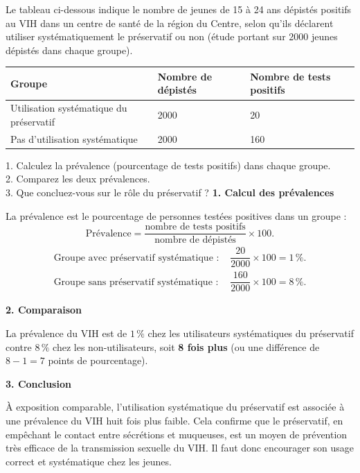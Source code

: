 \documentclass[11pt]{article}
\begin{document}
\begin{exoresolu}
Le tableau ci-dessous indique le nombre de jeunes de 15 à 24 ans dépistés positifs au VIH dans un centre de santé de la région du Centre, selon qu'ils déclarent utiliser systématiquement le préservatif ou non (étude portant sur \num{2000} jeunes dépistés dans chaque groupe).
\begin{center}
\begin{tabularx}{\linewidth}{|l|X|X|}\hline
\rowcolor{popblueL} Groupe & Nombre de dépistés & Nombre de tests positifs \\ \hline
Utilisation systématique du préservatif & \num{2000} & 20 \\ \hline
Pas d'utilisation systématique & \num{2000} & 160 \\ \hline
\end{tabularx}
\end{center}
1. Calculez la prévalence (pourcentage de tests positifs) dans chaque groupe.\\
2. Comparez les deux prévalences.\\
3. Que concluez-vous sur le rôle du préservatif ?
\tcblower
\textbf{1. Calcul des prévalences}

La prévalence est le pourcentage de personnes testées positives dans un groupe :
\[
\text{Prévalence} = \dfrac{\text{nombre de tests positifs}}{\text{nombre de dépistés}} \times 100.
\]
\begin{align*}
\text{Groupe avec préservatif systématique : } & \dfrac{20}{2000} \times 100 = 1\,\%.\\
\text{Groupe sans préservatif systématique : } & \dfrac{160}{2000} \times 100 = 8\,\%.
\end{align*}

\textbf{2. Comparaison}

La prévalence du VIH est de $1\,\%$ chez les utilisateurs systématiques du préservatif contre $8\,\%$ chez les non-utilisateurs, soit \textbf{8 fois plus} (ou une différence de $8 - 1 = 7$ points de pourcentage).

\textbf{3. Conclusion}

À exposition comparable, l'utilisation systématique du préservatif est associée à une prévalence du VIH huit fois plus faible. Cela confirme que le préservatif, en empêchant le contact entre sécrétions et muqueuses, est un moyen de prévention très efficace de la transmission sexuelle du VIH. Il faut donc encourager son usage correct et systématique chez les jeunes.
\end{exoresolu}
\end{document}
